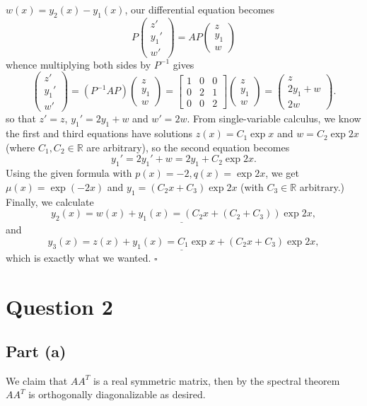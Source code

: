 \documentclass[12pt]{article}
\begin{document}
$w(x)=y_2(x)-y_1(x)$, our differential equation becomes
\[
    P\begin{pmatrix} z'\\y_1'\\w' \end{pmatrix}
    = AP\begin{pmatrix} z\\y_1\\w \end{pmatrix} 
\]
whence multiplying both sides by $P^{-1}$ gives
\[
    \begin{pmatrix} z'\\y_1'\\w' \end{pmatrix}
    = (P^{-1}AP)\begin{pmatrix} z\\y_1\\w \end{pmatrix} 
    =\begin{bmatrix} 1&0&0\\0&2&1\\0&0&2 \end{bmatrix}
    \begin{pmatrix} z\\y_1\\w \end{pmatrix} 
    =\begin{pmatrix} z\\2y_1+w\\2w \end{pmatrix}.
\]
so that $z'=z$, $y_1'=2y_1+w$ and $w'=2w$.
From single-variable calculus, we know the first and third equations have
solutions $z(x)=C_1\exp x$ and $w=C_2\exp{2x}$ (where $C_1,C_2\in\mathbb{R}$ are
arbitrary), so the second equation becomes
\[
    y_1'=2y_1'+w=2y_1+C_2\exp{2x}.
\]
Using the given formula with $p(x)=-2, q(x)=\exp{2x}$,
we get $\mu(x)=\exp{(-2x)}$ and \underline{$y_1=(C_2 x+C_3)\exp{2x}$}
(with $C_3\in\mathbb{R}$ arbitrary.) Finally, we calculate
\[
    \underline{y_2(x)=w(x)+y_1(x)=(C_2x+(C_2+C_3))\exp{2x}},
\]
and
\[
    \underline{y_3(x)=z(x)+y_1(x)=C_1\exp x + (C_2x+C_3)\exp{2x}},
\]
which is exactly what we wanted.
\hfill$\square$

\newpage
\section*{Question 2}
\subsection*{Part (a)}
We claim that $AA^{T}$ is a real symmetric matrix, then by the spectral
theorem $AA^T$ is orthogonally diagonalizable as desired.
\end{document}
